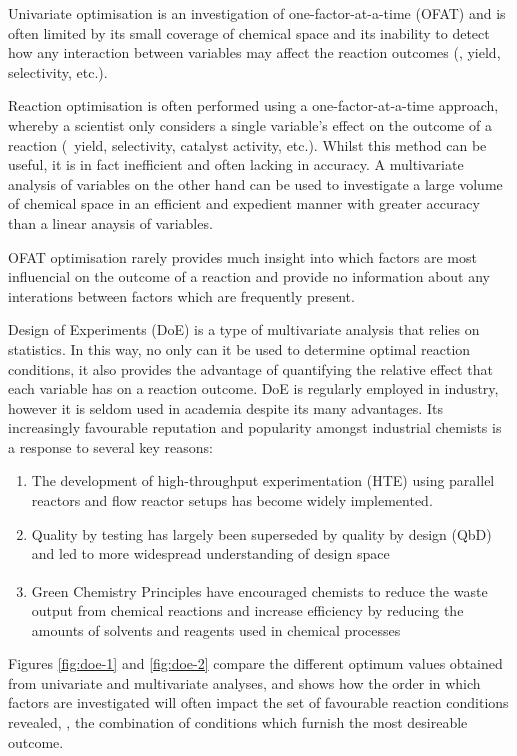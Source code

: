 Univariate optimisation is an investigation of one-factor-at-a-time (OFAT) and is often limited by its small coverage of chemical space and its inability to detect how any interaction between variables may affect the reaction outcomes (\eg, yield, selectivity, etc.).

Reaction optimisation is often performed using a one-factor-at-a-time approach, whereby a scientist only considers a single variable's effect on the outcome of a reaction (\eg\ yield, selectivity, catalyst activity, etc.). Whilst this method can be useful, it is in fact inefficient and often lacking in accuracy. A multivariate analysis of variables on the other hand can be used to investigate a large volume of chemical space in an efficient and expedient manner with greater accuracy than a linear anaysis of variables.

OFAT optimisation rarely provides much insight into which factors are most influencial on the outcome of a reaction and provide no information about any interations between factors which are frequently present.

Design of Experiments (DoE) is a type of multivariate analysis that relies on statistics. In this way, no only can it be used to determine optimal reaction conditions, it also provides the advantage of quantifying the relative effect that each variable has on a reaction outcome. DoE is regularly employed in industry, however it is seldom used in academia despite its many advantages. Its increasingly favourable reputation and popularity amongst industrial chemists is a response to several key reasons:

\begin{enumerate}
  \item The development of high-throughput experimentation (HTE) using parallel reactors and flow reactor setups has become widely implemented.
  \item Quality by testing has largely been superseded by quality by design (QbD) and led to more widespread understanding of design space
  \item Green Chemistry Principles\textsuperscript{\cite{anastas:2010}} have encouraged chemists to reduce the waste output from chemical reactions and increase efficiency by reducing the amounts of solvents and reagents used in chemical processes
\end{enumerate}


Figures \ref{fig:doe-1} and \ref{fig:doe-2} compare the different optimum values obtained from univariate and multivariate analyses, and shows how the order in which factors are investigated will often impact the set of favourable reaction conditions revealed, \ie, the combination of conditions which furnish the most desireable outcome.

